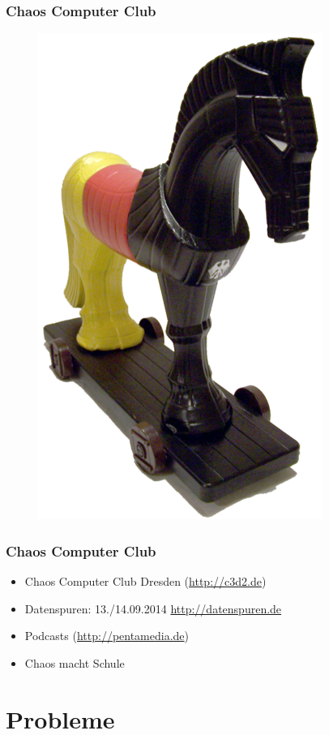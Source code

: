 \documentclass[12pt]{beamer}
\begin{document}
\begin{frame}
  \frametitle{Chaos Computer Club}
  \begin{figure}
    \includegraphics[height=0.7\textheight]{img/trojaner.png}
  \end{figure}
\end{frame}

\begin{frame}
    \frametitle{Chaos Computer Club}
    \begin{itemize}
      \item<1-> Chaos Computer Club Dresden (\url{http://c3d2.de})
          \note{}
      \item<2-> Datenspuren: 13./14.09.2014 \url{http://datenspuren.de}
      \item<3-> Podcasts (\url{http://pentamedia.de})
      \item<4-> Chaos macht Schule
    \end{itemize}
\end{frame}

\section{Probleme}
\end{document}
